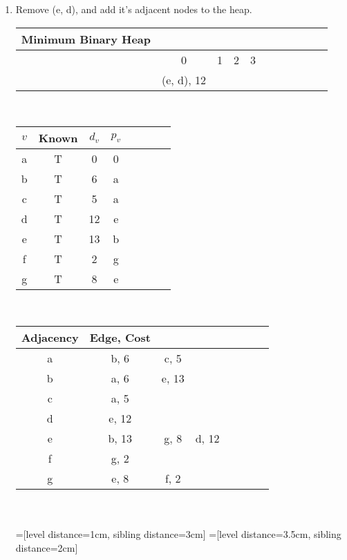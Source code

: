 \documentclass[11pt]{article}
\begin{document}
\begin{enumerate}
\begin{enumerate}
\item Remove (e, d), and add it's adjacent nodes to the heap.\\
\begin{tabular}{ccccccccccc}
Minimum Binary Heap\\\hline
&0&1&2&3&\\
&(e, d), 12 \\
\end{tabular}\\
\begin{tabular}{c|ccccccc|}
$v$& Known& $d_v$ & $p_v$\\\hline
a&T & 0 & 0\\
b&T & 6 & a\\
c&T & 5 & a\\
d&T & 12 & e\\
e&T & 13 & b\\
f&T & 2 & g\\
g&T & 8 & e
\end{tabular}\\
\begin{tabular}{c|ccccccc|}
Adjacency& Edge, Cost\\\hline
a& b, 6 & c, 5\\
b&a, 6&e, 13\\
c&a, 5&\\
d& e, 12\\
e&b, 13& g, 8& d, 12\\
f& g, 2\\
g& e, 8& f, 2\\
\end{tabular}\\
\\
=[level distance=1cm, sibling distance=3cm]
=[level distance=3.5cm, sibling distance=2cm]



\end{enumerate}
\end{enumerate}
\end{document}
